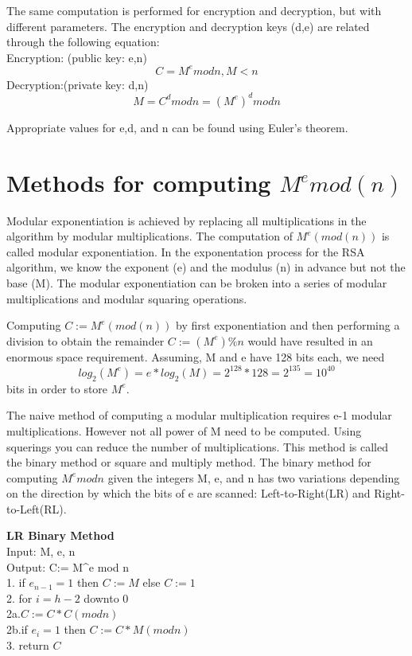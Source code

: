 The same computation is performed for encryption and decryption, but with different parameters. The encryption and decryption keys (d,e) are related through the following equation:\\
Encryption: (public key: {e,n})
\begin{equation}
    C=M^e mod n, M<n
\end{equation}
Decryption:(private key: {d,n})
\begin{equation}
    M=C^d mod n = (M^e)^d mod n
\end{equation}

Appropriate values for e,d, and n can be found using Euler's theorem.


\section{Methods for computing $M^emod(n)$}
Modular exponentiation is achieved by replacing all multiplications in the algorithm by modular multiplications.
The computation of $M^e(mod(n))$ is called modular exponentiation. In the exponentation process for the RSA algorithm, we know the exponent (e) and the modulus (n) in advance but not the base (M). 
The modular exponentiation can be broken into a series of modular multiplications and modular squaring operations.

Computing $C:= M^e (mod(n))$ by first exponentiation and then performing a division to obtain the remainder $C:=(M^e)\%n $ would have resulted in an enormous space requirement. Assuming, M and e have 128 bits each, we need
\begin{equation}
    log_2(M^e)=e*log_2(M) = 2^{128}*128=2^{135} = 10^{40}
\end{equation}
bits in order to store $M^e$.

The naive method of computing a modular multiplication requires e-1 modular multiplications. However not all power of M need to be computed. Using squerings you can reduce the number of multiplications. This method is called the binary method or square and multiply method.
The binary method for computing $M^emodn$ given the integers M, e, and n has two variations depending on the direction by which the bits of e are scanned: Left-to-Right(LR) and Right-to-Left(RL).

\begin{algorithm}
\setAlgoLined
    \textbf{LR Binary Method}\\
    Input: M, e, n\\
    Output: C:= M^e mod n\\
    1. if $e_{n-1}=1$ then $C:=M$ else $C:=1$\\
    2. for $i=h-2$ downto 0\\
    2a.\quad $C:=C * C (mod n)$\\
    2b.\quad if $e_{i}=1$ then $C:=C * M (mod n)$\\
    3. return $C$
\end{algorithm}

